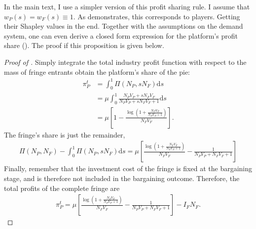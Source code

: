 \documentclass[a4paper]{article}
\newcommand{\ds}{\mathrm{d}s}
\begin{document}
In the main text, I use a simpler version of this profit sharing rule.
I assume that $w_P(s) = w_F(s) \equiv 1$.
As  demonstrates, this corresponds to players. Getting their Shapley values in the end.
Together with the assumptions on the demand system, one can even derive a closed form expression for the platform's profit share ().
The proof if this proposition is given below.
\begin{proof}[Proof of ]
    Simply integrate the total industry profit function with respect to the mass of fringe entrants obtain the platform's share of the pie:
    \begin{align*}
        \pi^t_P &= \int_0^1 \Pi(N_P, sN_F) \ds \\
        &= \mu \int_0^1 \frac{N_P V_P + s N_F V_F}{N_P V_P + s N_F V_F + 1} \ds \\
        &= \mu \left[ 1 - \frac{\log \left(1 + \frac{N_F V_F}{N_P V_P + 1} \right)}{N_F V_F} \right].
    \end{align*}
    The fringe's share is just the remainder,
    \begin{align*}
        \Pi(N_P, N_F) - \int_0^1 \Pi(N_P, sN_F) \ds = \mu \left[ \frac{\log \left( 1 + \frac{N_F V_F}{N_P V_P + 1} \right)}{N_F V_F} - \frac{1}{N_P V_P + N_F V_F + 1} \right]
    \end{align*}
    Finally, remember that the investment cost of the fringe is fixed at the bargaining stage, and is therefore not included in the bargaining outcome.
    Therefore, the total profits of the complete fringe are
    \begin{align*}
        \pi^t_P = \mu \left[ \frac{\log \left( 1 + \frac{N_F V_F}{N_P V_P + 1} \right)}{N_F V_F} - \frac{1}{N_P V_P + N_F V_F + 1} \right] - I_F N_F.
    \end{align*}
\end{proof}
\end{document}
